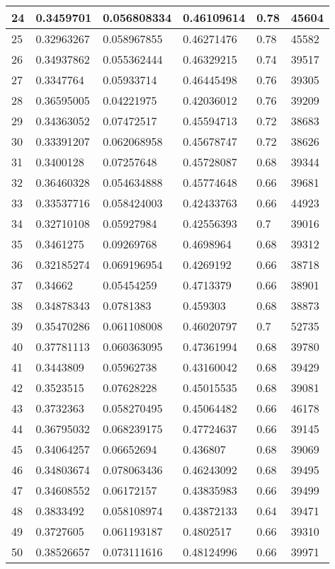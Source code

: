\begin{longtable}{|l|l|l|l|l|l|}
24 & 0.3459701 & 0.056808334 & 0.46109614 & 0.78 & 45604 \\ \hline 
25 & 0.32963267 & 0.058967855 & 0.46271476 & 0.78 & 45582 \\ \hline 
26 & 0.34937862 & 0.055362444 & 0.46329215 & 0.74 & 39517 \\ \hline 
27 & 0.3347764 & 0.05933714 & 0.46445498 & 0.76 & 39305 \\ \hline 
28 & 0.36595005 & 0.04221975 & 0.42036012 & 0.76 & 39209 \\ \hline 
29 & 0.34363052 & 0.07472517 & 0.45594713 & 0.72 & 38683 \\ \hline 
30 & 0.33391207 & 0.062068958 & 0.45678747 & 0.72 & 38626 \\ \hline 
31 & 0.3400128 & 0.07257648 & 0.45728087 & 0.68 & 39344 \\ \hline 
32 & 0.36460328 & 0.054634888 & 0.45774648 & 0.66 & 39681 \\ \hline 
33 & 0.33537716 & 0.058424003 & 0.42433763 & 0.66 & 44923 \\ \hline 
34 & 0.32710108 & 0.05927984 & 0.42556393 & 0.7 & 39016 \\ \hline 
35 & 0.3461275 & 0.09269768 & 0.4698964 & 0.68 & 39312 \\ \hline 
36 & 0.32185274 & 0.069196954 & 0.4269192 & 0.66 & 38718 \\ \hline 
37 & 0.34662 & 0.05454259 & 0.4713379 & 0.66 & 38901 \\ \hline 
38 & 0.34878343 & 0.0781383 & 0.459303 & 0.68 & 38873 \\ \hline 
39 & 0.35470286 & 0.061108008 & 0.46020797 & 0.7 & 52735 \\ \hline 
40 & 0.37781113 & 0.060363095 & 0.47361994 & 0.68 & 39780 \\ \hline 
41 & 0.3443809 & 0.05962738 & 0.43160042 & 0.68 & 39429 \\ \hline 
42 & 0.3523515 & 0.07628228 & 0.45015535 & 0.68 & 39081 \\ \hline 
43 & 0.3732363 & 0.058270495 & 0.45064482 & 0.66 & 46178 \\ \hline 
44 & 0.36795032 & 0.068239175 & 0.47724637 & 0.66 & 39145 \\ \hline 
45 & 0.34064257 & 0.06652694 & 0.436807 & 0.68 & 39069 \\ \hline 
46 & 0.34803674 & 0.078063436 & 0.46243092 & 0.68 & 39495 \\ \hline 
47 & 0.34608552 & 0.06172157 & 0.43835983 & 0.66 & 39499 \\ \hline 
48 & 0.3833492 & 0.058108974 & 0.43872133 & 0.64 & 39471 \\ \hline 
49 & 0.3727605 & 0.061193187 & 0.4802517 & 0.66 & 39310 \\ \hline 
50 & 0.38526657 & 0.073111616 & 0.48124996 & 0.66 & 39971 \\ \hline 
\end{longtable}